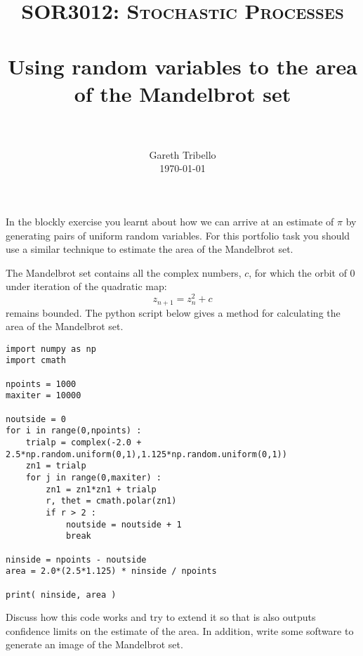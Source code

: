 \documentclass[paper=a4, fontsize=11pt]{scrartcl}
\title{\usefont{OT1}{bch}{b}{n} \normalfont \normalsize \textsc{SOR3012:
Stochastic Processes} \\ [25pt] \horrule{0.5pt} \\[0.4cm] 
\huge Using random variables to the area of the Mandelbrot set \\
\horrule{2pt} \\[0.25cm]
}
\author{ \normalfont
\normalsize
        Gareth Tribello \\[-3pt] \normalsize
        \today
}
\date{}
\numberwithin{equation}{section}
\numberwithin{figure}{section}
\numberwithin{table}{section}
\begin{document}
\maketitle

In the blockly exercise you learnt about how we can arrive at an estimate of $\pi$ by generating pairs of uniform random variables. For this portfolio task you should 
use a similar technique to estimate the area of the Mandelbrot set.

The Mandelbrot set contains all the complex numbers, $c$, for which the orbit of 0 under iteration of the quadratic map:
$$
z_{n+1} = z_n^2 + c
$$
remains bounded.  The python script below gives a method for calculating the area of the Mandelbrot set.

\begin{lstlisting}[caption=Calculating the area of the Mandelbrot set]
import numpy as np
import cmath

npoints = 1000
maxiter = 10000

noutside = 0
for i in range(0,npoints) :
    trialp = complex(-2.0 + 2.5*np.random.uniform(0,1),1.125*np.random.uniform(0,1))
    zn1 = trialp
    for j in range(0,maxiter) :
        zn1 = zn1*zn1 + trialp
        r, thet = cmath.polar(zn1)
        if r > 2 :
            noutside = noutside + 1
            break

ninside = npoints - noutside
area = 2.0*(2.5*1.125) * ninside / npoints

print( ninside, area )
\end{lstlisting}

Discuss how this code works and try to extend it so that is also outputs confidence limits on the estimate of the area.  In addition, write some software to generate 
an image of the Mandelbrot set.
\end{document}
